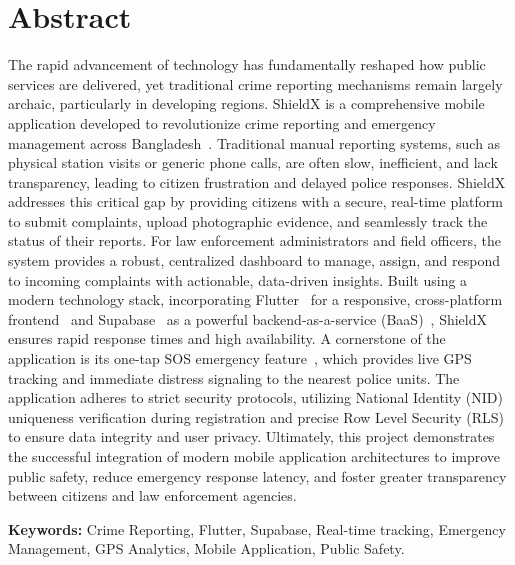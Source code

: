 \documentclass[12pt, a4paper, twoside, openany]{report}
\begin{document}
\chapter*{Abstract}
The rapid advancement of technology has fundamentally reshaped how public services are delivered, yet traditional crime reporting mechanisms remain largely archaic, particularly in developing regions. ShieldX is a comprehensive mobile application developed to revolutionize crime reporting and emergency management across Bangladesh~\cite{smp}. Traditional manual reporting systems, such as physical station visits or generic phone calls, are often slow, inefficient, and lack transparency, leading to citizen frustration and delayed police responses. 
ShieldX addresses this critical gap by providing citizens with a secure, real-time platform to submit complaints, upload photographic evidence, and seamlessly track the status of their reports. For law enforcement administrators and field officers, the system provides a robust, centralized dashboard to manage, assign, and respond to incoming complaints with actionable, data-driven insights. Built using a modern technology stack, incorporating Flutter~\cite{flutter} for a responsive, cross-platform frontend~\cite{crossplat} and Supabase~\cite{supabase} as a powerful backend-as-a-service (BaaS)~\cite{baas}, ShieldX ensures rapid response times and high availability. 
A cornerstone of the application is its one-tap SOS emergency feature~\cite{sos}, which provides live GPS tracking and immediate distress signaling to the nearest police units. The application adheres to strict security protocols, utilizing National Identity (NID) uniqueness verification during registration and precise Row Level Security (RLS)~\cite{rls} to ensure data integrity and user privacy. Ultimately, this project demonstrates the successful integration of modern mobile application architectures to improve public safety, reduce emergency response latency, and foster greater transparency between citizens and law enforcement agencies.

\vspace{0.5cm}
\noindent\textbf{Keywords:} Crime Reporting, Flutter, Supabase, Real-time tracking, Emergency Management, GPS Analytics, Mobile Application, Public Safety.
\tableofcontents
\clearpage
\listoffigures
{}
\listoftables
{}
\clearpage
\end{document}

